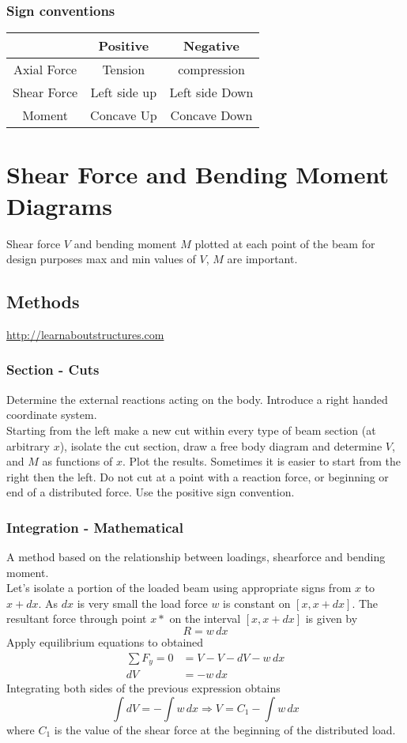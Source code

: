 \documentclass[14pt]{article}
\begin{document}
    \subsubsection{Sign conventions}
    \begin{tabular}{|c|c|c|}
        \hline
        &Positive & Negative\\
        \hline
        Axial Force& Tension& compression\\
        Shear Force& Left side up& Left side Down\\
        Moment& Concave Up& Concave Down\\
        \hline
    \end{tabular}
    \section{Shear Force and Bending Moment Diagrams}
    Shear force $V$ and bending moment $M$ plotted at each point of the
    beam for design purposes max and min values of $V$, $M$ are
    important.
    \subsection{Methods}
    \url{http://learnaboutstructures.com}
    \subsubsection{Section - Cuts}
    Determine the external reactions acting on the body. Introduce a
    right handed coordinate system.\\
    Starting from the left make a new cut within every type of beam
    section (at arbitrary $x$), isolate the cut section, draw a free
    body diagram and determine $V$, and $M$ as functions of $x$. Plot
    the results. Sometimes it is easier to start from the right then the
    left. Do not cut at a point with a reaction force, or beginning or
    end of a distributed force. Use the positive sign convention.
    \subsubsection{Integration - Mathematical}
    A method based on the relationship between loadings, shearforce and
    bending moment.\\
    Let's isolate a portion of the loaded beam using appropriate signs
    from $x$ to $x+dx$. As $dx$ is very small the load force $w$ is
    constant on $[x, x+dx]$. The resultant force through point $x*$ on
    the interval $[x, x+dx]$ is given by 
    $$R=w\, dx$$ Apply equilibrium equations to obtained
    \begin{align*}
        \sum F_y=0&=V-V-dV-w\, dx\\
        dV&=-w\, dx
    \end{align*}
    Integrating both sides of the previous expression obtains
    $$\int dV=-\int w\, dx\Rightarrow V=C_1-\int w\, dx$$ where $C_1$ is
    the value of the shear force at the beginning of the distributed
    load.
\end{document}

